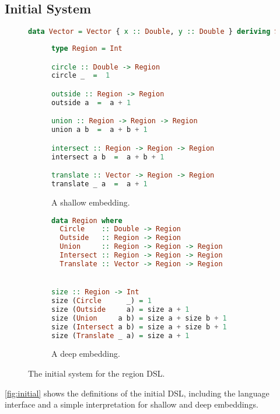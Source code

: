 \subsection{Initial System}

\begin{figure}
\begin{lstlisting}[language=Haskell,basicstyle=\ttfamily\footnotesize]
data Vector = Vector { x :: Double, y :: Double } deriving Show
\end{lstlisting}
\begin{subfigure}[b]{.5\textwidth}
\begin{lstlisting}[language=Haskell,deletekeywords={union,intersect},basicstyle=\ttfamily\footnotesize]
type Region = Int

circle :: Double -> Region
circle _  =  1

outside :: Region -> Region
outside a  =  a + 1

union :: Region -> Region -> Region
union a b  =  a + b + 1

intersect :: Region -> Region -> Region
intersect a b  =  a + b + 1

translate :: Vector -> Region -> Region
translate _ a  =  a + 1
\end{lstlisting}
\caption{A shallow embedding.}
\end{subfigure}%
\begin{subfigure}[b]{.5\textwidth}
\begin{lstlisting}[language=Haskell,basicstyle=\ttfamily\footnotesize]
data Region where
  Circle    :: Double -> Region
  Outside   :: Region -> Region
  Union     :: Region -> Region -> Region
  Intersect :: Region -> Region -> Region
  Translate :: Vector -> Region -> Region


size :: Region -> Int
size (Circle      _) = 1
size (Outside     a) = size a + 1
size (Union     a b) = size a + size b + 1
size (Intersect a b) = size a + size b + 1
size (Translate _ a) = size a + 1
\end{lstlisting}
\caption{A deep embedding.} \label{fig:pattern}
\end{subfigure}
\caption{The initial system for the region DSL.} \label{fig:initial}
\end{figure}

\noindent
\autoref{fig:initial} shows the definitions of the initial DSL, including the
language interface and a simple interpretation for shallow and deep embeddings.

